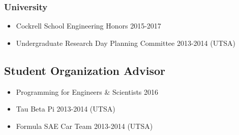 \subsubsection*{University}
\begin{itemize}
    \item Cockrell School Engineering Honors 2015-2017
    \item Undergraduate Research Day Planning Committee 2013-2014 (UTSA)
\end{itemize}

\subsection*{Student Organization Advisor}
\begin{itemize}
    \item Programming for Engineers \& Scientists 2016
    \item Tau Beta Pi 2013-2014 (UTSA)
    \item Formula SAE Car Team 2013-2014 (UTSA)
\end{itemize}
